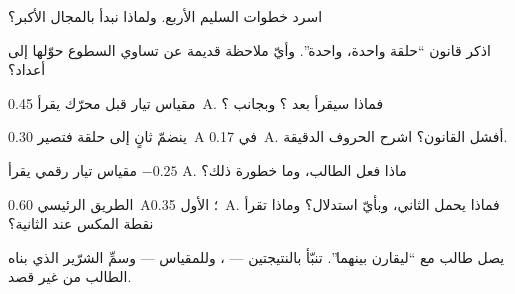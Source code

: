 \begin{exercise}[$\star$]\label{exo:g8:intensity-ammeter:4}
اسرد خطوات   السليم الأربع. ولماذا نبدأ بالمجال
الأكبر؟
\end{exercise}

\begin{exercise}[$\star$]\label{exo:g8:intensity-ammeter:5}
اذكر قانون ``حلقة واحدة،  واحدة''. وأيّ ملاحظة قديمة عن
تساوي السطوع حوّلها إلى أعداد؟
\end{exercise}

\begin{exercise}[$\star$]\label{exo:g8:intensity-ammeter:6}
مقياس تيار قبل محرّك  يقرأ \qty{0.45}{A}. فماذا
سيقرأ بعد ؟ وبجانب ؟
\end{exercise}

\begin{exercise}[$\star$]\label{exo:g8:intensity-ammeter:7}
ينضمّ  ثانٍ إلى حلقة  فتصير \qty{0.30}{A} في
 \qty{0.17}{A}. أفشل القانون؟ اشرح الحروف
الدقيقة.
\end{exercise}

\begin{exercise}[$\star$]\label{exo:g8:intensity-ammeter:8}
مقياس تيار رقمي يقرأ $-0.25$ \unit{A}. ماذا فعل الطالب، وما
خطورة ذلك؟
\end{exercise}

\begin{exercise}[$\star\star$]\label{exo:g8:intensity-ammeter:9}
الطريق الرئيسي \qty{0.60}{A}؛  الأول \qty{0.35}{A}. فماذا
يحمل  الثاني، وبأيّ استدلال؟ وماذا تقرأ نقطة المكس عند
 الثانية؟
\end{exercise}

\begin{exercise}[$\star\star$]\label{exo:g8:intensity-ammeter:10}
يصل طالب  \emph{} مع  ``ليقارن
بينهما''. تنبّأ بالنتيجتين --- ، وللمقياس --- وسمِّ
الشرّير الذي بناه الطالب من غير قصد.
\end{exercise}


